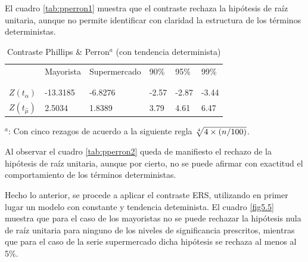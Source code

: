 \documentclass[12pt, twoside]{book}\usepackage[]{graphicx}\usepackage[]{color}
\numberwithin{equation}{section}
\numberwithin{theorem}{section}
\numberwithin{teorema}{section}
\numberwithin{defi}{section}
\numberwithin{prop}{section}
\numberwithin{defi}{section}
\theoremstyle{plain}
\begin{document}
El cuadro \ref{tab:pperron1} muestra que el contraste rechaza la hipótesis de raíz unitaria, aunque no permite identificar con claridad la estructura de los términos deterministas. 





\begin{table}[h]
\centering
\begin{threeparttable}
\caption{Contraste Phillips \& Perron$^{a}$ (con tendencia determinista) \label{tab:pperron2}}
\begin{tabular}{@{}llllll@{}}
\toprule
\multicolumn{1}{c}{} &
\multicolumn{1}{l}{Mayorista} & 
\multicolumn{1}{l}{Supermercado} & 
90\% & 95\% & 99\% \\ 
\\
\cmidrule(l){2-2} \cmidrule(l){3-3} \cmidrule(l){4-6} \\
$Z(t_{\hat{\alpha}})$ & -13.3185 & -6.8276 &  -2.57 & -2.87 & -3.44 \\
$Z(t_{\hat{\mu}})$ & 2.5034 & 1.8389 & 3.79 & 4.61 & 6.47 \\
\bottomrule
\end{tabular}
\label{tab-5}
\begin{tablenotes}
\small 
\item $^{a}$: Con cinco rezagos de acuerdo a la siguiente regla $\root 4 \of {4 \times (n/100)}$. 
\end{tablenotes}
\end{threeparttable}
\end{table}

Al observar el cuadro \ref{tab:pperron2} queda de manifiesto el rechazo de la hipótesis de raíz unitaria, aunque por cierto, no se puede afirmar con exactitud el comportamiento de los términos deterministas. 



Hecho lo anterior, se procede a aplicar el contraste ERS, utilizando en primer lugar un modelo con constante y tendencia deteminista. El cuadro \ref{fig5.5} muestra que para el caso de los mayoristas no se puede rechazar la hipótesis nula de raíz unitaria para ninguno de los niveles de significancia prescritos, mientras que para el caso de la serie supermercado dicha hipótesis se rechaza al menos al 5\%.  
\end{document}
